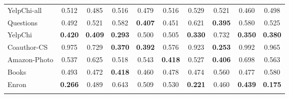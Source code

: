 \documentclass[pdflatex,sn-mathphys-ay]{sn-jnl}
\theoremstyle{plain}
\theoremstyle{remark}
\begin{document}
\begin{appendices}
\begin{table}[h]
\begin{tabular*}{\textwidth}{@{\extracolsep{\fill}}lccccccccc@{}}
YelpChi-all & 0.512 & 0.485 & 0.516 & 0.479 & 0.516 & 0.529 & 0.521 & 0.460 & 0.498 \\
Questions & 0.492 & 0.521 & 0.582 & \textbf{0.407} & 0.451 & 0.621 & \textbf{0.395} & 0.580 & 0.525 \\
YelpChi & \textbf{0.420} & \textbf{0.409} & \textbf{0.293} & 0.500 & 0.505 & \textbf{0.330} & 0.732 & \textbf{0.350} & \textbf{0.380} \\
\midrule
Coauthor-CS & 0.975 & 0.729 & \textbf{0.370} & \textbf{0.392} & 0.576 & 0.923 & \textbf{0.253} & 0.992 & 0.965 \\
Amazon-Photo & 0.537 & 0.625 & 0.518 & 0.543 & \textbf{0.418} & 0.527 & \textbf{0.406} & 0.698 & 0.563 \\
Books & 0.493 & 0.472 & \textbf{0.418} & 0.460 & 0.478 & 0.474 & 0.560 & 0.477 & 0.580 \\
Enron & \textbf{0.266} & 0.489 & 0.643 & 0.509 & 0.530 & \textbf{0.221} & 0.460 & \textbf{0.439} & \textbf{0.175} \\
\botrule
\end{tabular*}
\end{table}
\clearpage

\end{appendices}


\end{document}
